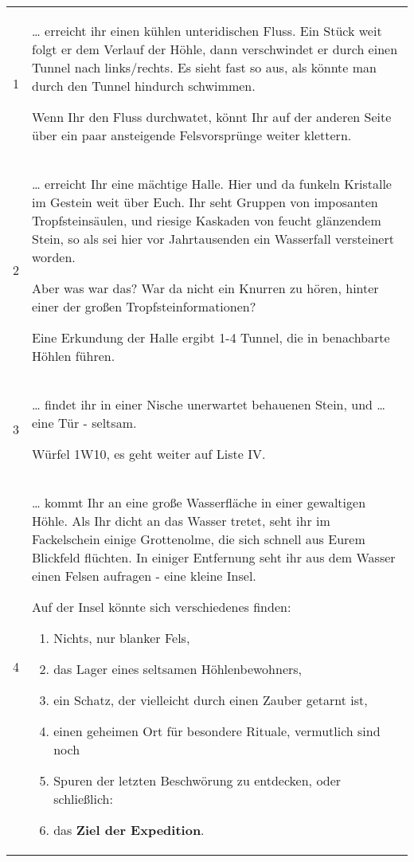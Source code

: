 \documentclass[11pt]{wbzine}
\begin{document}
\begin{tabularx}{\columnwidth}{cZ}
1 & \ldots{} erreicht ihr einen kühlen unteridischen Fluss. Ein Stück weit
  folgt er dem Verlauf der Höhle, dann verschwindet er durch einen
  Tunnel nach links/rechts. Es sieht fast so aus, als könnte man durch
  den Tunnel hindurch schwimmen.

  Wenn Ihr den Fluss durchwatet, könnt Ihr auf der anderen Seite über
  ein paar ansteigende Felsvorsprünge weiter klettern.  \\

2 & \ldots{} erreicht Ihr eine mächtige Halle. Hier und da funkeln
  Kristalle im Gestein weit über Euch. Ihr seht Gruppen von imposanten
  Tropfsteinsäulen, und riesige Kaskaden von feucht glänzendem Stein, so
  als sei hier vor Jahrtausenden ein Wasserfall versteinert worden.

  Aber was war das? War da nicht ein Knurren zu hören, hinter einer der
  großen Tropfsteinformationen?

  Eine Erkundung der Halle ergibt 1-4 Tunnel, die in benachbarte Höhlen
  führen.  \\
3 & \ldots{} findet ihr in einer Nische unerwartet behauenen Stein, und
  \ldots{} eine Tür - seltsam.

  Würfel 1W10, es geht weiter auf Liste IV.  \\

4 & \ldots{} kommt Ihr an eine große Wasserfläche in einer gewaltigen
  Höhle. Als Ihr dicht an das Wasser tretet, seht ihr im Fackelschein
  einige Grottenolme, die sich schnell aus Eurem Blickfeld flüchten. In
  einiger Entfernung seht ihr aus dem Wasser einen Felsen aufragen -
  eine kleine Insel.

  Auf der Insel könnte sich verschiedenes finden:

  \begin{enumerate}
    \item Nichts, nur blanker Fels,
    \item das Lager eines seltsamen Höhlenbewohners,
    \item ein Schatz, der vielleicht durch einen Zauber getarnt ist,
    \item einen geheimen Ort für besondere Rituale, vermutlich sind noch
    \item Spuren der letzten Beschwörung zu entdecken, oder schließlich:
    \item das \textbf{Ziel der Expedition}.
  \end{enumerate}


\end{tabularx}
\end{document}
